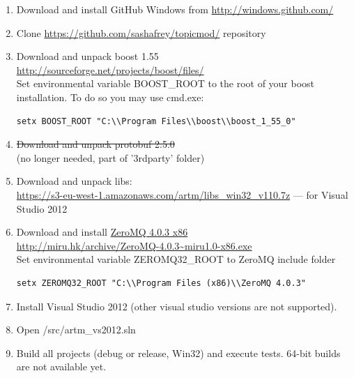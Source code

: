 \documentclass[11pt,a4paper,twoside]{report}
\begin{document}
\begin{enumerate}
   \item Download and install GitHub Windows from \url{http://windows.github.com/}
   \item Clone \url{https://github.com/sashafrey/topicmod/} repository
   \item Download and unpack boost 1.55  \\
         \url{http://sourceforge.net/projects/boost/files/} \\
         Set environmental variable BOOST\_ROOT to the root of your boost installation.
         To do so you may use cmd.exe:
\begin{verbatim}
setx BOOST_ROOT "C:\\Program Files\\boost\\boost_1_55_0"
\end{verbatim}
   \item \st{Download and unpack protobuf 2.5.0} \\ (no longer needed, part of '3rdparty' folder)
   \item Download and unpack libs: \\
    \url{https://s3-eu-west-1.amazonaws.com/artm/libs_win32_v110.7z} --- for Visual Studio 2012
   \item Download and install \href{http://zeromq.org/distro:microsoft-windows}{ZeroMQ 4.0.3 x86} \\
         \url{http://miru.hk/archive/ZeroMQ-4.0.3~miru1.0-x86.exe} \\
         Set environmental variable ZEROMQ32\_ROOT to ZeroMQ include folder
\begin{verbatim}
setx ZEROMQ32_ROOT "C:\\Program Files (x86)\\ZeroMQ 4.0.3"
\end{verbatim}
    \item Install Visual Studio 2012 (other visual studio versions are not supported). \\
    \item Open /src/artm\_vs2012.sln
    \item Build all projects (debug or release, Win32) and execute tests. 64-bit builds are not available yet.
\end{enumerate}
\end{document}
